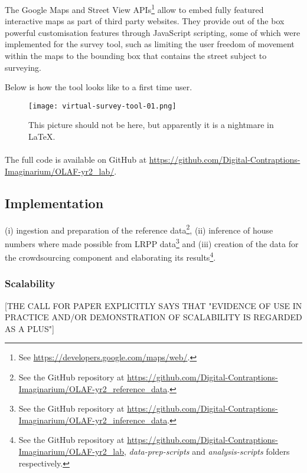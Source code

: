         The Google Maps and Street View APIs\footnote{See \url{https://developers.google.com/maps/web/}.} allow to embed fully featured interactive maps as part of third party websites. They provide out of the box powerful customisation features through JavaScript scripting, some of which were implemented for the survey tool, such as limiting the user freedom of movement within the maps to the bounding box that contains the street subject to surveying.   
        
        Below is how the tool looks like to a first time user.
    
        \begin{figure*}
        	\texttt{[image: virtual-survey-tool-01.png]}
        	\caption{This picture should not be here, but apparently it is a nightmare in LaTeX.}
        	\label{fig:some_figure}
        \end{figure*}
        
        \paragraph{}

        The full code is available on GitHub at \url{https://github.com/Digital-Contraptions-Imaginarium/OLAF-yr2_lab/}.

    \subsection{Implementation}


(i) ingestion and preparation of the reference data\footnote{See the GitHub repository at \url{https://github.com/Digital-Contraptions-Imaginarium/OLAF-yr2_reference_data}.}, (ii) inference of house numbers where made possible from LRPP data\footnote{See the GitHub repository at \url{https://github.com/Digital-Contraptions-Imaginarium/OLAF-yr2_inference_data}.} and (iii) creation of the data for the crowdsourcing component and elaborating its results\footnote{See the GitHub repository at \url{https://github.com/Digital-Contraptions-Imaginarium/OLAF-yr2_lab}, {\it data-prep-scripts} and {\it analysis-scripts} folders respectively.}. 


    	
    \subsubsection{Scalability}
    
        [THE CALL FOR PAPER EXPLICITLY SAYS THAT "EVIDENCE OF USE IN PRACTICE AND/OR DEMONSTRATION OF SCALABILITY IS REGARDED AS A PLUS"]
    
